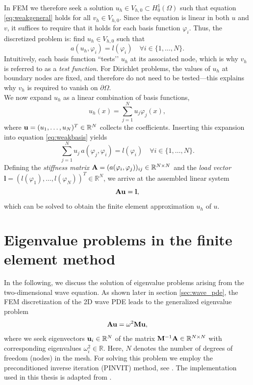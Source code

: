 In FEM we therefore seek a solution $u_h \in V_{h,0}\subset H^1_0(\Omega)$ such that equation \eqref{eq:weakgeneral} holds for all $v_h \in V_{h,0}$. Since the equation is linear in both $u$ and $v$, it suffices to require that it holds for each basis function $\varphi_i$. Thus, the discretized problem is: find $u_h \in V_{h,0}$ such that
\begin{equation}
    a(u_h,\varphi_i) = l(\varphi_i) \quad \forall i \in \{1,\ldots,N\}.
    \label{eq:weakbasis}
\end{equation}
Intuitively, each basis function “tests’’ $u_h$ at its associated node, which is why $v_h$ is referred to as a \textit{test function}. For Dirichlet problems, the values of $u_h$ at boundary nodes are fixed, and therefore do not need to be tested—this explains why $v_h$ is required to vanish on $\partial \Omega$.\\

We now expand $u_h$ as a linear combination of basis functions,
\[
u_h(x) = \sum_{j=1}^N u_j \varphi_j(x),
\]
where $\mathbf{u} = (u_1,\ldots,u_{N})^T \in \mathbb{R}^N$ collects the coefficients. Inserting this expansion into equation \eqref{eq:weakbasis} yields
\begin{equation}
    \sum_{j=1}^N u_j \, a(\varphi_j,\varphi_i) = l(\varphi_i) \quad \forall i \in \{1,\ldots,N\}.
\end{equation}
Defining the \textit{stiffness matrix} $\mathbf{A} = (a(\varphi_i, \varphi_j))_{ij} \in \mathbb{R}^{N\times N}$ and the \textit{load vector} $\mathbf{l} = (l(\varphi_1),\ldots,l(\varphi_N))^T \in \mathbb{R}^N$, we arrive at the assembled linear system
\begin{equation*}
    \mathbf{A} \mathbf{u} = \mathbf{l},
\end{equation*}
which can be solved to obtain the finite element approximation $u_h$ of $u$.



\section{Eigenvalue problems in the finite element method}
\label{sec:eigenvalue_problems}
In the following, we discuss the solution of eigenvalue problems arising from the two-dimensional wave equation. As shown later in section \ref{sec:wave_pde}, the FEM discretization of the 2D wave PDE leads to the generalized eigenvalue problem
\begin{equation*}
    \mathbf{A} \mathbf{u} = \omega^2 \mathbf{M} \mathbf{u},
\end{equation*}
where we seek eigenvectors $\mathbf{u}_i \in \mathbb{R}^N$ of the matrix $\mathbf{M}^{-1}\mathbf{A} \in \mathbb{R}^{N\times N}$ with corresponding eigenvalues $\omega_i^2 \in \mathbb{R}$. Here, $N$ denotes the number of degrees of freedom (nodes) in the mesh. For solving this problem we employ the preconditioned inverse iteration (PINVIT) method, see \cite{KNYAZEV+NEYMEYR}. The implementation used in this thesis is adapted from \cite{NGSolveEig}.\\

